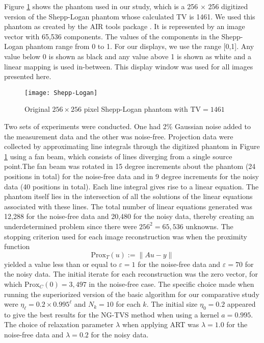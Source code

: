 \documentclass[smallextended]{svjour3}      %
\begin{document}
Figure \ref{fig: Shepp-Logan-phantom} shows the phantom used in our study, which is a 256 $\times$ 256 digitized version of the Shepp-Logan phantom whose calculated TV is 1461. We used this phantom as created by the AIR tools package \cite{Hansen2012airtools}. It is represented by an image vector with 65,536 components. The values of the components in the Shepp-Logan phantom range from 0 to 1. For our displays, we use the range {[}0,1{]}. Any value below 0 is shown as black and any value above 1 is shown as white and a linear mapping is used in-between. This display window was used for all images presented here.

\begin{figure}
	\centering
	\texttt{[image: Shepp-Logan]}
	\caption{Original $256\times256$ pixel Shepp-Logan phantom with $\mbox{TV}=1461$ \label{fig: Shepp-Logan-phantom}}
\end{figure}

Two sets of experiments were conducted. One had 2\% Gaussian noise added to the measurement data and the other was noise-free. Projection data were collected by approximating line integrals through the digitized phantom in Figure \ref{fig: Shepp-Logan-phantom} using a fan beam, which consists of lines diverging from a single source point.The fan beam was rotated in 15 degree increments about the phantom (24 positions in total) for the noise-free data and in 9 degree increments for the noisy data (40 positions in total). Each line integral gives rise to a linear equation. The phantom itself lies in the intersection of all the solutions of the linear equations associated with these lines. The total number of linear equations generated was 12,288 for the noise-free data and 20,480 for the noisy data, thereby creating an underdetermined problem since there were $256^{2}=65,536$ unknowns. The stopping criterion used for each image reconstruction was when the proximity function
\begin{equation}
\mbox{Prox}_{T}(u):=\|Au-y\|
\end{equation}
yielded a value less than or equal to $\varepsilon=1$ for the noise-free data and $\varepsilon=70$ for the noisy data. The initial iterate for each reconstruction was the zero vector, for which $\mbox{Prox}_{C}(0)=3,497$ in the noise-free case. The specific choice made when running the superiorized version of the basic algorithm for our comparative study were  $\eta_{\ell}=0.2\times0.995^{\ell}$ and $N_{k}=10$ for each $k$. The initial size $\eta_{0}=0.2$ appeared to give the best results for the NG-TVS method when using a kernel $a=0.995$.  The choice of relaxation parameter $\lambda$ when applying ART was $\lambda=1.0$ for the noise-free data and $\lambda=0.2$ for the noisy data.
\end{document}
